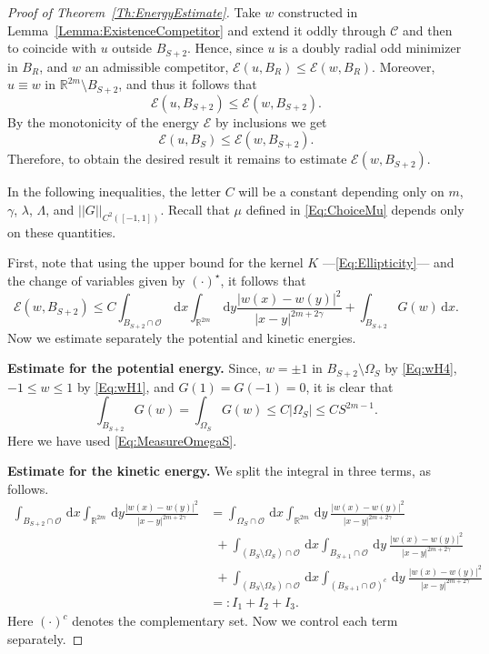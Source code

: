 \documentclass[12pt,reqno]{amsart}
\theoremstyle{definition}
\theoremstyle{remark}
\newcommand{\con}[1]{\mathbb{#1}}
\newcommand{\R}{\con{R}} %
\newcommand{\ccal}{\mathscr{C}}
\newcommand{\ecal}{\mathcal{E}}
\newcommand{\ocal}{\mathcal{O}}
\newcommand{\norm}[1]{\left | \left |{#1} \right | \right |}
\newcommand{\s}{\gamma}
\renewcommand{\d}{\,\mathrm{d}} %
\numberwithin{equation}{section}
\begin{document}
	\begin{proof}[Proof of Theorem~\ref{Th:EnergyEstimate}]
		Take $w$ constructed in Lemma~\ref{Lemma:ExistenceCompetitor} and extend it oddly through $\ccal$ and then to coincide with $u$ outside $B_{S+2}$.  Hence, since $u$ is a doubly radial odd minimizer in $B_R$, and $w$ an admissible competitor, $\ecal (u, B_R) \leq \ecal (w, B_R)$. Moreover, $u\equiv w$ in $\R^{2m}\setminus B_{S+2}$, and thus it follows that
		$$ 
		\ecal (u, B_{S+2}) \leq \ecal (w, B_{S+2}).
		$$
		By the monotonicity of the energy $\ecal$ by inclusions we get
		$$ 
		\ecal (u, B_{S}) \leq \ecal (w, B_{S+2}). 
		$$
		Therefore, to obtain the desired result it remains to estimate $\ecal (w, B_{S+2})$. 
		
		
		In the following inequalities, the letter $C$ will be a constant depending only on $m$, $\s$, $\lambda$, $\Lambda$, and $\norm{G}_{C^2([-1,1])}$. Recall that $\mu$ defined in \eqref{Eq:ChoiceMu} depends only on these quantities.
		
		First, note that using the upper bound for the kernel $K$ ---\eqref{Eq:Ellipticity}--- and the change of variables given by $(\cdot)^\star$, it follows that
		$$ 
		\ecal(w,B_{S+2}) \leq C \int_{B_{S+2}\cap \ocal} \d x \int_{\R^{2m}} \d y \frac{|w(x)-w(y)|^2}{|x-y|^{2m+2\s}} + \int_{B_{S+2}} G(w) \d x. 
		$$
		Now we estimate separately the potential and kinetic energies.
		
		\medskip
		
		\textbf{Estimate for the potential energy.}
		Since, $w=\pm 1$ in $B_{S+2} \setminus \Omega_S$ by \eqref{Eq:wH4}, $-1\leq w\leq 1$ by \eqref{Eq:wH1}, and $G(1) = G(-1) = 0$, it is clear that
		$$ 
		\int_{B_{S+2}} G(w) = \int_{\Omega_S} G(w) \leq C |\Omega_S| \leq C S^{2m-1}.
		$$  
		Here we have used \eqref{Eq:MeasureOmegaS}.
		
		\medskip
		
		\textbf{Estimate for the kinetic energy.}
		We split the integral in three terms, as follows.
		\begin{align*}
		\int_{B_{S+2}\cap \ocal} \d x \int_{\R^{2m}} \d y \frac{|w(x)-w(y)|^2}{|x-y|^{2m+2\s}} &= \int_{\Omega_{S}\cap \ocal} \d x \int_{\R^{2m}} \d y \ \frac{|w(x)-w(y)|^2}{|x-y|^{2m+2\s}} \\
		&\ \ + \int_{(B_S\setminus \Omega_S)\cap \ocal} \d x \int_{B_{S+1}\cap \ocal} \d y \ \frac{|w(x)-w(y)|^2}{|x-y|^{2m+2\s}} \\
		&\ \ + \int_{(B_S\setminus \Omega_S)\cap \ocal} \d x \int_{(B_{S+1}\cap \ocal)^c} \d y \ \frac{|w(x)-w(y)|^2}{|x-y|^{2m+2\s}} \\
		&=: I_1+I_2+I_3.
		\end{align*}
		Here $(\cdot)^c$ denotes the complementary set. Now we control each term separately.
		

\end{proof}
\end{document}
